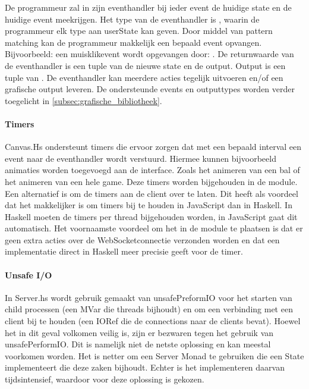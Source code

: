 De programmeur zal in zijn eventhandler bij ieder event de huidige state en de huidige event meekrijgen. Het type van de eventhandler is , waarin de programmeur elk type aan userState kan geven. Door middel van pattern matching kan de programmeur makkelijk een bepaald event opvangen. Bijvoorbeeld: een muisklikevent wordt opgevangen door: . De returnwaarde van de eventhandler is een tuple van de nieuwe state en de output. Output is een tuple van . De eventhandler kan meerdere acties tegelijk uitvoeren en/of een grafische output leveren. De ondersteunde events en outputtypes worden verder toegelicht in \autoref{subsec:grafische_bibliotheek}.

\paragraph{Timers}
Canvas.Hs ondersteunt timers die ervoor zorgen dat met een bepaald interval een event naar de eventhandler wordt verstuurd. Hiermee kunnen bijvoorbeeld animaties worden toegevoegd aan de interface. Zoals het animeren van een bal of het animeren van een hele game. Deze timers worden bijgehouden in de module. Een alternatief is om de timers aan de client over te laten. Dit heeft als voordeel dat het makkelijker is om timers bij te houden in JavaScript dan in Haskell. In Haskell moeten de timers per thread bijgehouden worden, in JavaScript gaat dit automatisch. Het voornaamste voordeel om het in de module te plaatsen is dat er geen extra acties over de WebSocketconnectie verzonden worden en dat een implementatie direct in Haskell meer precisie geeft voor de timer.

\paragraph{Unsafe I/O}
In Server.hs wordt gebruik gemaakt van unsafePreformIO voor het starten van child processen (een MVar die threads bijhoudt) en om een verbinding met een client bij te houden (een IORef die de connections naar de clients bevat). Hoewel het in dit geval volkomen veilig is, zijn er bezwaren tegen het gebruik van unsafePerformIO\cite{Haskell.org2008}. Dit is namelijk niet de netste oplossing en kan meestal voorkomen worden. Het is netter om een Server Monad te gebruiken die een State implementeert die deze zaken bijhoudt. Echter is het implementeren daarvan tijdsintensief, waardoor voor deze oplossing is gekozen.
